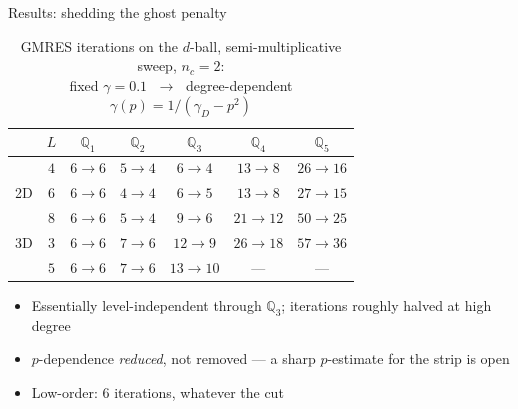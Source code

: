 \documentclass{beamer}
\begin{document}
\begin{frame}{Results: shedding the ghost penalty}
    \begin{table}
        \centering
        \caption{GMRES iterations on the $d$-ball, semi-multiplicative sweep, $n_c = 2$:\\
            fixed $\gamma=0.1$ $\;\to\;$ degree-dependent $\gamma(p)=1/(\gamma_D-p^2)$}
        \footnotesize
        \begin{tabular}{cc|ccccc}
            \toprule
               & $L$ & $\mathbb Q_1$ & $\mathbb Q_2$ & $\mathbb Q_3$ & $\mathbb Q_4$ & $\mathbb Q_5$ \\
            \midrule
               & $4$ & $6\to6$       & $5\to4$       & $6\to4$       & $13\to8$      & $26\to16$     \\
            2D & $6$ & $6\to6$       & $4\to4$       & $6\to5$       & $13\to8$      & $27\to15$     \\
               & $8$ & $6\to6$       & $5\to4$       & $9\to6$       & $21\to12$     & $50\to25$     \\
            \midrule
            3D & $3$ & $6\to6$       & $7\to6$       & $12\to9$      & $26\to18$     & $57\to36$     \\
               & $5$ & $6\to6$       & $7\to6$       & $13\to10$     & ---           & ---           \\
            \bottomrule
        \end{tabular}
    \end{table}
    \begin{itemize}
        \small
        \item Essentially level-independent through $\mathbb Q_3$; iterations \alert{roughly halved} at high degree
        \item $p$-dependence \emph{reduced}, not removed --- a sharp $p$-estimate for the strip is open
        \item Low-order: $6$ iterations, whatever the cut
    \end{itemize}
\end{frame}

\end{document}
